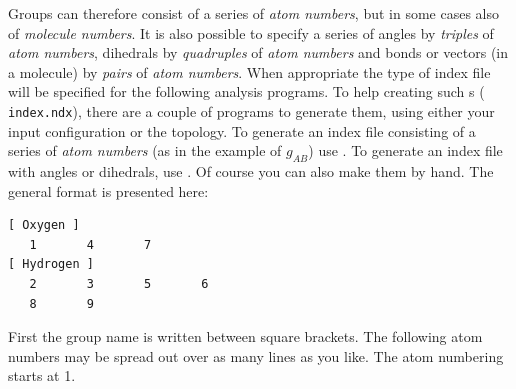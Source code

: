 Groups can therefore consist of a series of {\em atom numbers}, but in
some cases also of {\em molecule numbers}.  It is also possible to
specify a series of angles by {\em triples} of {\em atom numbers},
dihedrals by {\em quadruples} of {\em atom numbers} and bonds or
vectors (in a molecule) by {\em pairs} of {\em atom numbers}. When
appropriate the type of index file will be specified for the following
analysis programs.  To help creating such s ({\tt
index.ndx}), there are a couple of programs to generate them, using
either your input configuration or the topology.  To generate an
index file consisting of a series of {\em atom numbers} (as in the
example of $g_{AB}$) use {\tt {}}. To generate an index file
with angles or dihedrals, use {\tt {}}. Of course you can also
make them by hand. The general format is presented here:
{\samepage
\begin{verbatim}
[ Oxygen ]
   1       4       7 
[ Hydrogen ]
   2       3       5       6
   8       9
\end{verbatim}}

First the group name is written between square brackets. The following
atom numbers may be spread out over as many lines as you like. The
atom numbering starts at 1.

